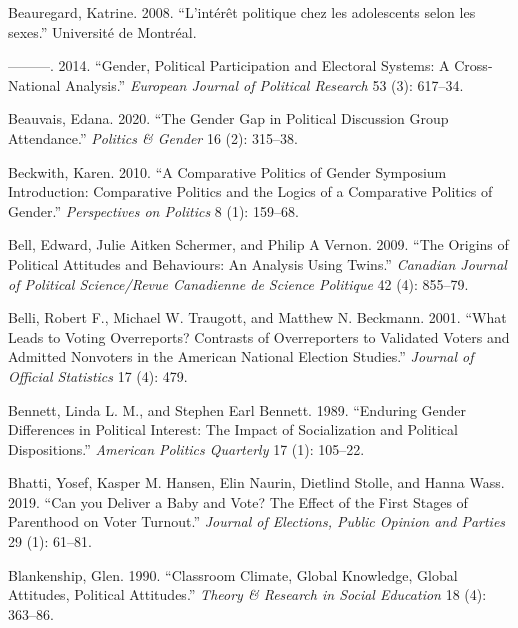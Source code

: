 \documentclass[
  letterpaper,
  DIV=11,
  numbers=noendperiod]{scrreprt}
\newlength{\cslhangindent}
\newlength{\cslentryspacingunit} %
\newenvironment{CSLReferences}[2] %
 {%
  \setlength{\parindent}{0pt}
  \ifodd #1
  \let\oldpar\par
  \def\par{\hangindent=\cslhangindent\oldpar}
  \fi
  \setlength{\parskip}{#2\cslentryspacingunit}
 }%
 {}
\begin{document}
\begin{CSLReferences}{1}{0}
\leavevmode{}%
Beauregard, Katrine. 2008. {``{L'intérêt politique chez les adolescents
selon les sexes}.''} Université de Montréal.

\leavevmode{}%
---------. 2014. {``{Gender, Political Participation and Electoral
Systems: A Cross-National Analysis}.''} \emph{European Journal of
Political Research} 53 (3): 617--34.

\leavevmode{}%
Beauvais, Edana. 2020. {``{The Gender Gap in Political Discussion Group
Attendance}.''} \emph{Politics \& Gender} 16 (2): 315--38.

\leavevmode{}%
Beckwith, Karen. 2010. {``{A Comparative Politics of Gender Symposium
Introduction: Comparative Politics and the Logics of a Comparative
Politics of Gender}.''} \emph{Perspectives on Politics} 8 (1): 159--68.

\leavevmode{}%
Bell, Edward, Julie Aitken Schermer, and Philip A Vernon. 2009. {``{The
Origins of Political Attitudes and Behaviours: An Analysis Using
Twins}.''} \emph{Canadian Journal of Political Science/Revue Canadienne
de Science Politique} 42 (4): 855--79.

\leavevmode{}%
Belli, Robert F., Michael W. Traugott, and Matthew N. Beckmann. 2001.
{``{What Leads to Voting Overreports? Contrasts of Overreporters to
Validated Voters and Admitted Nonvoters in the American National
Election Studies}.''} \emph{Journal of Official Statistics} 17 (4): 479.

\leavevmode{}%
Bennett, Linda L. M., and Stephen Earl Bennett. 1989. {``{Enduring
Gender Differences in Political Interest: The Impact of Socialization
and Political Dispositions}.''} \emph{American Politics Quarterly} 17
(1): 105--22.

\leavevmode{}%
Bhatti, Yosef, Kasper M. Hansen, Elin Naurin, Dietlind Stolle, and Hanna
Wass. 2019. {``{Can you Deliver a Baby and Vote? The Effect of the First
Stages of Parenthood on Voter Turnout}.''} \emph{Journal of Elections,
Public Opinion and Parties} 29 (1): 61--81.

\leavevmode{}%
Blankenship, Glen. 1990. {``{Classroom Climate, Global Knowledge, Global
Attitudes, Political Attitudes}.''} \emph{Theory \& Research in Social
Education} 18 (4): 363--86.


\end{CSLReferences}
\end{document}
